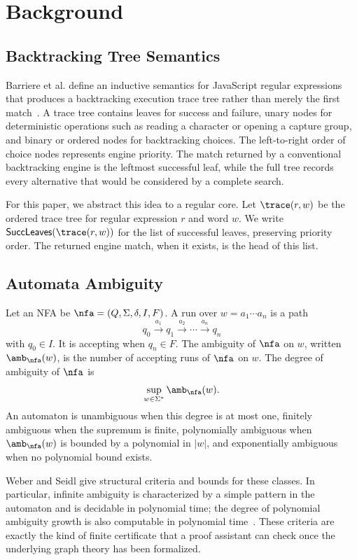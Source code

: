 \section{Background}

\subsection{Backtracking Tree Semantics}

Barriere et al. define an inductive semantics for JavaScript regular
expressions that produces a backtracking execution trace tree rather than merely
the first match~\cite{barriere2026jsregex}.  A trace tree contains leaves for
success and failure, unary nodes for deterministic operations such as reading a
character or opening a capture group, and binary or ordered nodes for
backtracking choices.  The left-to-right order of choice nodes represents engine
priority.  The match returned by a conventional backtracking engine is the
leftmost successful leaf, while the full tree records every alternative that
would be considered by a complete search.

For this paper, we abstract this idea to a regular core.  Let
\(\trace(r,w)\) be the ordered trace tree for regular expression \(r\) and word
\(w\).  We write \(\mathsf{SuccLeaves}(\trace(r,w))\) for the list of successful
leaves, preserving priority order.  The returned engine match, when it exists,
is the head of this list.

\subsection{Automata Ambiguity}

Let an NFA be \(\nfa=(Q,\Sigma,\delta,I,F)\).  A run over
\(w=a_1\cdots a_n\) is a path
\[
  q_0 \xrightarrow{a_1} q_1 \xrightarrow{a_2} \cdots
  \xrightarrow{a_n} q_n
\]
with \(q_0\in I\).  It is accepting when \(q_n\in F\).  The ambiguity of
\(\nfa\) on \(w\), written \(\amb_{\nfa}(w)\), is the number of accepting runs
of \(\nfa\) on \(w\).  The degree of ambiguity of \(\nfa\) is
\[
  \sup_{w\in\Sigma^*} \amb_{\nfa}(w).
\]
An automaton is unambiguous when this degree is at most one, finitely ambiguous
when the supremum is finite, polynomially ambiguous when \(\amb_{\nfa}(w)\) is
bounded by a polynomial in \(|w|\), and exponentially ambiguous when no
polynomial bound exists.

Weber and Seidl give structural criteria and bounds for these classes.  In
particular, infinite ambiguity is characterized by a simple pattern in the
automaton and is decidable in polynomial time; the degree of polynomial
ambiguity growth is also computable in polynomial time~\cite{weber1991ambiguity}.
These criteria are exactly the kind of finite certificate that a proof assistant
can check once the underlying graph theory has been formalized.
